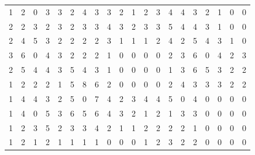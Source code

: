 \documentclass[fontsize=12pt,doubleside,openany,listof=totoc,listof=flat,listof=nochaptergap,numbers=noenddot]{scrbook}
\theoremstyle{style}
\begin{document}
\begin{center}
\begin{minipage}{\textwidth}
\renewcommand{\arraystretch}{1.0}
\begin{table}[H]
\centering 
\begin{scriptsize}
\begin{tabular}{|>{}c|>{}c|>{}c|>{}c|>{}c|>{}c|>{}c|>{}c|>{}c|>{}c|>{}c|>{}c|>{}c|>{}c|>{}c|>{}c|>{}c|>{}c|>{}c|>{}c|}
\hline
1&2&0&3&3&2&4&3&3&2&1&2&3&4&4&3&2&1&\cellcolor{gray!50!white}0&\cellcolor{gray!50!white}0\\
\hhline{|--------------------|} 
2&2&3&2&3&2&3&3&4&3&2&3&3&5&4&4&3&1&\cellcolor{gray!50!white}0&\cellcolor{gray!50!white}0 \\
\hline
2&4&5&3&2&2&2&2&3&1&1&1&2&4&2&5&4&3&1&0 \\
\hline
3&6&\cellcolor{gray!50!white}0&4&3&2&2&2&1&\cellcolor{gray!50!white}0&\cellcolor{gray!50!white}0&\cellcolor{gray!50!white}0&\cellcolor{gray!50!white}0&2&3&6&\cellcolor{gray!50!white}0&4&2&3\\
\hline
2&5&4&4&3&5&4&3&1&\cellcolor{gray!50!white}0&\cellcolor{gray!50!white}0&\cellcolor{gray!50!white}0&\cellcolor{gray!50!white}0&1&3&6&5&3&2&2
\\
\hline
1&2&2&2&1&5&8&6&2&\cellcolor{gray!50!white}0&\cellcolor{gray!50!white}0&\cellcolor{gray!50!white}0&\cellcolor{gray!50!white}0&2&4&3&3&3&2&2
\\
\hline
1&4&4&3&2&5&\cellcolor{gray!50!white}0&7&4&2&3&4&4&5&\cellcolor{gray!50!white}0&4&\cellcolor{gray!50!white}0&\cellcolor{gray!50!white}0&\cellcolor{gray!50!white}0&\cellcolor{gray!50!white}0
\\
\hline
1&4&\cellcolor{gray!50!white}0&5&3&6&5&6&4&3&2&1&2&1&3&3&\cellcolor{gray!50!white}0&\cellcolor{gray!50!white}0&\cellcolor{gray!50!white}0&\cellcolor{gray!50!white}0 \\
\hline
1&2&3&5&2&3&3&4&2&1&1&2&2&2&2&1&\cellcolor{gray!50!white}0&\cellcolor{gray!50!white}0&\cellcolor{gray!50!white}0&\cellcolor{gray!50!white}0 \\
\hline
1&2&1&2&1&1&1&1&0&0&0&1&2&3&2&2&\cellcolor{gray!50!white}0&\cellcolor{gray!50!white}0&\cellcolor{gray!50!white}0&\cellcolor{gray!50!white}0 \\
\hline
\end{tabular}
\label{HJKmlp_image_Gartenmatrix}
\end{scriptsize} 
\end{table}
\renewcommand{\arraystretch}{1}
\end{minipage}
\end{center}
\end{document}
